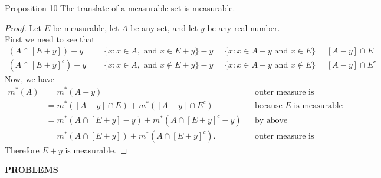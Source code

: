 \begin{flushleft}
	\begin{namedthm*}{Proposition 10}
		The translate of a measurable set is measurable.		
	\end{namedthm*}
	\begin{proof}
		Let $E$ be measurable, let $A$ be any set, and let $y$ be any real number.
		\\First we need to see that 
		\begin{align*}
			(A\cap [E+y])-y&=\{x:x\in A,\text{ and }x\in E+y\}-y=\{x:x\in A-y\text{ and }x\in E\}=[A-y]\cap E\\
			(A\cap [E+y]^c)-y&=\{x:x\in A,\text{ and }x\notin E+y\}-y=\{x:x\in A-y\text{ and }x\notin E\}=[A-y]\cap E^c
		\end{align*}
		Now, we have
		\begin{align*}
			m^*(A)&=m^*(A-y)&&\text{outer measure is translation invariant}\\
			&=m^*([A-y]\cap E)+m^*([A-y]\cap E^c)&&\text{because $E$ is measurable}\\
			&=m^*(A\cap [E+y]-y)+m^*(A\cap [E+y]^c-y)&&\text{by above}\\
			&=m^*(A\cap [E+y])+m^*(A\cap [E+y]^c).&&\text{outer measure is translation invariant}
		\end{align*}
		Therefore $E+y$ is measurable.
	\end{proof}

\end{flushleft}
\begin{center}
	\textbf{PROBLEMS}
\end{center}
